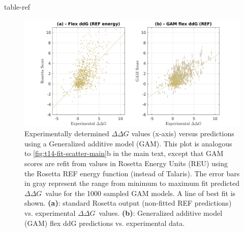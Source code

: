 \documentclass[journal=jpcbfk,manuscript=suppinfo]{achemso}
\newcommand\ddg{$\Delta\Delta G$}
\begin{document}

{table-ref}

\begin{figure}
  \includegraphics[width=\textwidth,keepaspectratio]{figures/zemu-sigmoid2-corrs-supp.png}
  \caption[]{
    Experimentally determined $\Delta\Delta G$ values (x-axis) versus predictions using a Generalized additive model (GAM).
    This plot is analogous to \cref{fig:t14-fit-scatter-main}b in the main text, except that GAM scores are refit from values in Rosetta Energy Units (REU) using the Rosetta REF\cite{alford_rosetta_2017} energy function (instead of Talaris\cite{song_structure-guided_2011,shapovalov_smoothed_2011,omeara_combined_2015}).
    The error bars in gray represent the range from minimum to maximum fit predicted \ddg\ value for the 1000 sampled GAM models.
    A line of best fit is shown.
    \textbf{(a)}: standard Rosetta output (non-fitted REF predictions) vs. experimental \ddg\ values.
    \textbf{(b)}: Generalized additive model (GAM) flex ddG predictions vs. experimental data.
  } \label{fig:t14-fit-scatter-supp}
\end{figure}
\end{document}
